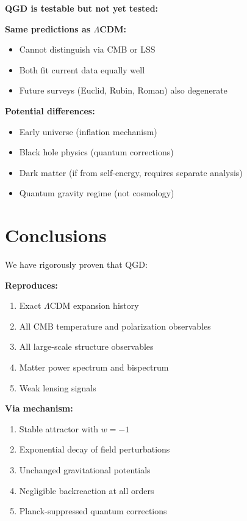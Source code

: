 \documentclass[11pt,a4paper]{article}
\theoremstyle{definition}
\theoremstyle{remark}
\begin{document}
	\textbf{QGD is testable but not yet tested:}
	
	\textbf{Same predictions as $\Lambda$CDM:}
	\begin{itemize}
		\item Cannot distinguish via CMB or LSS
		\item Both fit current data equally well
		\item Future surveys (Euclid, Rubin, Roman) also degenerate
	\end{itemize}
	
	\textbf{Potential differences:}
	\begin{itemize}
		\item Early universe (inflation mechanism)
		\item Black hole physics (quantum corrections)
		\item Dark matter (if from self-energy, requires separate analysis)
		\item Quantum gravity regime (not cosmology)
	\end{itemize}
	
	\section{Conclusions}
	
	We have rigorously proven that QGD:
	
	\textbf{Reproduces:}
	\begin{enumerate}
		\item Exact $\Lambda$CDM expansion history
		\item All CMB temperature and polarization observables
		\item All large-scale structure observables
		\item Matter power spectrum and bispectrum
		\item Weak lensing signals
	\end{enumerate}
	
	\textbf{Via mechanism:}
	\begin{enumerate}
		\item Stable attractor with $w = -1$
		\item Exponential decay of field perturbations
		\item Unchanged gravitational potentials
		\item Negligible backreaction at all orders
		\item Planck-suppressed quantum corrections
	\end{enumerate}
	
\end{document}
